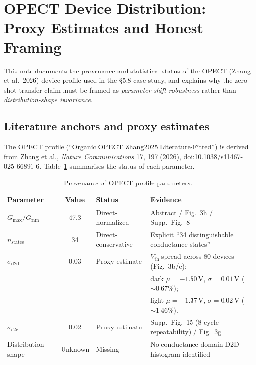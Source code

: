 
\section{OPECT Device Distribution: Proxy Estimates and Honest Framing}
\label{sec:supp-opect-distribution}

This note documents the provenance and statistical status of the OPECT (Zhang et al.~2026) device profile used in the \S5.8 case study, and explains why the zero-shot transfer claim must be framed as \emph{parameter-shift robustness} rather than \emph{distribution-shape invariance}.

\subsection{Literature anchors and proxy estimates}

The OPECT profile (``Organic OPECT Zhang2025 Literature-Fitted'') is derived from Zhang et al., \textit{Nature Communications} 17, 197 (2026), doi:10.1038/s41467-025-66891-6. Table~\ref{tab:opect-provenance} summarises the status of each parameter.

\begin{table}[ht]
\centering
\caption{Provenance of OPECT profile parameters.}
\label{tab:opect-provenance}
\begin{tabular}{@{}lcll@{}}
\toprule
Parameter & Value & Status & Evidence \\ \midrule
$G_{\max}/G_{\min}$ & 47.3 & Direct-normalized & Abstract / Fig.~3h / Supp.~Fig.~8 \\
$n_{\text{states}}$ & 34 & Direct-conservative & Explicit ``34 distinguishable conductance states'' \\
$\sigma_{\text{d2d}}$ & 0.03 & Proxy estimate & $V_{\text{th}}$ spread across 80 devices (Fig.~3b/c): \\
& & & dark $\mu=-1.50\,$V, $\sigma=0.01\,$V ($\sim$0.67\%); \\
& & & light $\mu=-1.37\,$V, $\sigma=0.02\,$V ($\sim$1.46\%). \\
$\sigma_{\text{c2c}}$ & 0.02 & Proxy estimate & Supp.~Fig.~15 (8-cycle repeatability) / Fig.~3g \\
Distribution shape & Unknown & Missing & No conductance-domain D2D histogram identified \\
\bottomrule
\end{tabular}
\end{table}

